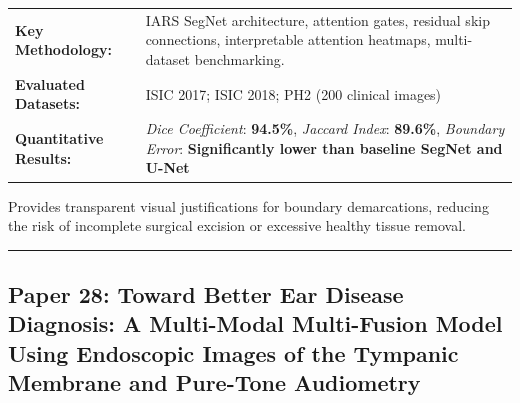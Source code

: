 \documentclass[10pt,a4paper]{article}
\begin{document}
\vspace{4pt}
\begin{tabularx}{\linewidth}{p{3.2cm}X}
\toprule
\textbf{Key Methodology:} & IARS SegNet architecture, attention gates, residual skip connections, interpretable attention heatmaps, multi-dataset benchmarking. \\
\textbf{Evaluated Datasets:} & ISIC 2017; ISIC 2018; PH2 (200 clinical images) \\
\textbf{Quantitative Results:} & \textit{Dice Coefficient}: \textbf{94.5\%}, \textit{Jaccard Index}: \textbf{89.6\%}, \textit{Boundary Error}: \textbf{Significantly lower than baseline SegNet and U-Net} \\
\bottomrule
\end{tabularx}
\vspace{4pt}
\begin{tcolorbox}[utilitybox,title=Clinical Utility and Real-World Impact]
Provides transparent visual justifications for boundary demarcations, reducing the risk of incomplete surgical excision or excessive healthy tissue removal.
\end{tcolorbox}
\vspace{12pt}
\hrule
\vspace{12pt}
\subsection*{Paper 28: Toward Better Ear Disease Diagnosis: A Multi-Modal Multi-Fusion Model Using Endoscopic Images of the Tympanic Membrane and Pure-Tone Audiometry}
\end{document}
